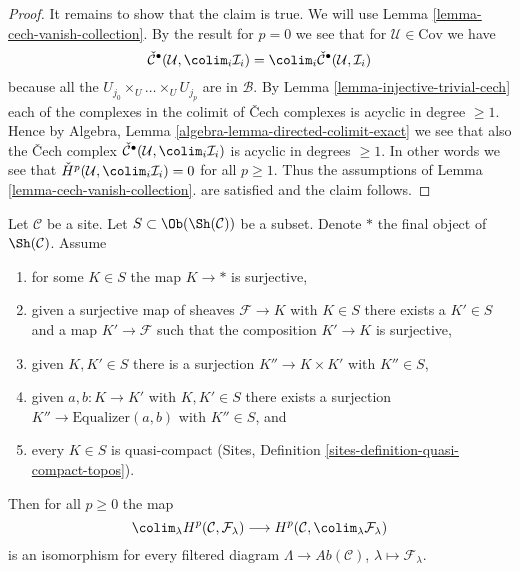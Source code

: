 \begin{proof}
\medskip\noindent
It remains to show that the claim is true. We will use
Lemma \ref{lemma-cech-vanish-collection}.
By the result for $p = 0$ we see that for $\mathcal{U} \in \text{Cov}$
we have
$$
\check{\mathcal{C}}^\bullet(\mathcal{U}, \colim_i \mathcal{I}_i)
=
\colim_i \check{\mathcal{C}}^\bullet(\mathcal{U}, \mathcal{I}_i)
$$
because all the $U_{j_0} \times_U \ldots \times_U U_{j_p}$
are in $\mathcal{B}$. By
Lemma \ref{lemma-injective-trivial-cech}
each of the complexes in the colimit of {\v C}ech complexes is
acyclic in degree $\geq 1$. Hence by
Algebra, Lemma \ref{algebra-lemma-directed-colimit-exact}
we see that also the {\v C}ech complex
$\check{\mathcal{C}}^\bullet(\mathcal{U}, \colim_i \mathcal{I}_i)$
is acyclic in degrees $\geq 1$. In other words we see that
$\check{H}^p(\mathcal{U}, \colim_i \mathcal{I}_i) = 0$
for all $p \geq 1$. Thus the assumptions of
Lemma \ref{lemma-cech-vanish-collection}.
are satisfied and the claim follows.
\end{proof}

\begin{lemma}
\label{lemma-colim-global}
Let $\mathcal{C}$ be a site. Let $S \subset \Ob(\Sh(\mathcal{C}))$
be a subset. Denote $*$ the final object of $\Sh(\mathcal{C})$. Assume
\begin{enumerate}
\item for some $K \in S$ the map $K \to *$ is surjective,
\item given a surjective map of sheaves $\mathcal{F} \to K$ with $K \in S$
there exists a $K' \in S$ and a map $K' \to \mathcal{F}$ such
that the composition $K' \to K$ is surjective,
\item given $K, K' \in S$ there is a surjection $K'' \to K \times K'$
with $K'' \in S$,
\item given $a, b : K \to K'$ with $K, K' \in S$ there exists a
surjection $K'' \to \text{Equalizer}(a, b)$ with $K'' \in S$, and
\item every $K \in S$ is quasi-compact
(Sites, Definition \ref{sites-definition-quasi-compact-topos}).
\end{enumerate}
Then for all $p \geq 0$ the map
$$
\colim_\lambda H^p(\mathcal{C}, \mathcal{F}_\lambda)
\longrightarrow
H^p(\mathcal{C}, \colim_\lambda \mathcal{F}_\lambda)
$$
is an isomorphism for every filtered diagram
$\Lambda \to \textit{Ab}(\mathcal{C})$, $\lambda \mapsto \mathcal{F}_\lambda$.
\end{lemma}

